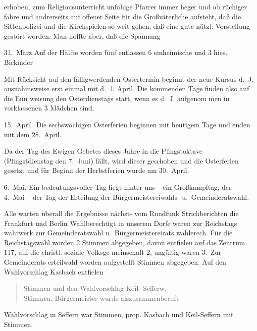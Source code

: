 

erhoben, zum Religionsunterricht unfähige Pfarrer immer heger und ob\ohb
rüchiger fahre und andrerseits auf offener Seite für die Großväterliche\unsicher\ob
aufsteht, daß die Sittenpolizei und die Kirchspielen so weit gehen, daß eine\ob
gute nützl. Vorstellung gestört worden. Man hoffte aber, daß die Spannung

31.\ März   Auf der Hälfte worden fünf entlassen 6 einheimische\ob
und 3 hies. Bickinder

Mit Rücksicht auf den fälligwerdenden Ostertermin beginnt\ob
der neue Kursus d.\ J. ausnahmsweise erst einmal mit\ob
d.\ 1. April. Die kommenden Tage finden also auf die Eün\ohb
weisung den Osterdienstags statt, wenn es d.\ J. aufgenom\ohb
men in vorklassenen 3 Mädchen sind.

15.\ April. Die sechswöchigen Osterferien beginnen mit heutigem\ob
Tage und enden mit dem 28.\ April.

Da der Tag des Ewigen Gebetes dieses Jahre in die\ob
Pfingstoktave (Pfingstdienstag den 7.\ Juni) fällt, wird\ob
dieser geschoben und die Osterferien gesetzt und\ob
für Beginn der Herbstferien wurde am 30.\ April.

6.\ Mai.    Ein bedeutungsvoller Tag liegt hinter uns – ein\ob
Großkampftag, der 4.\ Mai – der Tag der Erteilung\ob
der Bürgermeistereiwahls- u.\ Gemeinderatswahl.

Alle warten überall die Ergebnisse nächst- vom\ob
Rundfunk Strichberichten die Frankfurt und Berlin\ob
Wahlberechtigt in unserem Dorfe waren zur Reichstags\ohb
wahrwerk    zur Gemeinderatswahl u.\ Bürgermeistereirats\ohb
wahlerech.    Für die Reichstagswahl worden 2 Stimmen abgegeben, davon entfielen\ob
auf das Zentrum 117, auf die christl. soziale Volksge\ohb
meinschaft 2, ungültig waren 3.\ Zur Gemeinderats\ohb
erteilwahl worden aufgestellt     Stimmen\ob
abgegeben. Auf den Wahlvorschlag Kasbach entfielen

\pend
\begin{verse}
Stimmen und den Wahlvorschlag Keil- Sefferw.\\
Stimmen. Bürgermeister wurde als\unsicher zusammenberuft
\end{verse}
\pstart
Wahlvorschlag in Seffern war      Stimmen, prop.\unsicher\ob
Kasbach und    Keil-Seffern mit    Stimmen.
\pend
